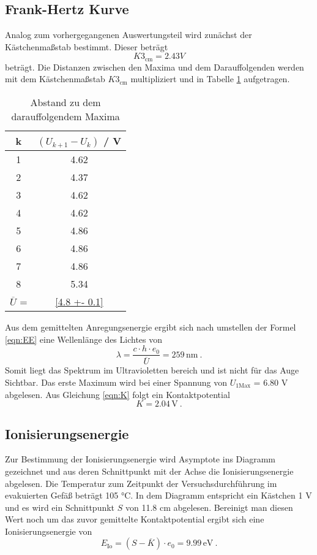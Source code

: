 \subsection{Frank-Hertz Kurve}
Analog zum vorhergegangenen Auswertungsteil wird zunächst der Kästchenmaßstab bestimmt. Dieser beträgt
\begin{equation}
  K3_\text{cm} = 2.43 V
  \label{eqn:K3}
\end{equation}
beträgt. Die Distanzen zwischen den Maxima und dem Darauffolgenden werden mit dem Kästchenmaßstab $K3_\text{cm}$ multipliziert und in Tabelle \ref{tab:Max} aufgetragen.
\begin{table}
  \centering
  \begin{tabular}{c c}
    \toprule
    	k & $(U_{k+1} - U_k)$ / V \\
    \midrule
    	1 & 4.62	\\
    	2 & 4.37	\\
    	3 & 4.62	\\
    	4 & 4.62	\\
    	5 & 4.86	\\
    	6 & 4.86	\\
    	7 & 4.86	\\
    	8 & 5.34	\\
    \midrule
    $\overline{U}$  = & \ref{4.8 +- 0.1} \\
    \bottomrule
  \end{tabular}
  \caption{Abstand zu dem darauffolgendem Maxima}
  \label{tab:Max}
\end{table}
Aus dem gemittelten Anregungsenergie ergibt sich nach umstellen der Formel \ref{eqn:EE} eine Wellenlänge des Lichtes von
\begin{equation}
  \lambda = \frac{c \cdot h \cdot e_0}{\overline{U}} = 259 \, \text{nm} \ .
  \label{eqn:spek}
\end{equation}
Somit liegt das Spektrum im Ultravioletten bereich und ist nicht für das Auge Sichtbar. Das erste Maximum wird bei einer Spannung von $U_{1 \text{Max}}$ = 6.80 V abgelesen. Aus Gleichung \ref{eqn:K} folgt ein Kontaktpotential
\begin{equation}
  K = 2.04 \, \text{V} \ .
  \label{eqn:KonFr}
\end{equation}
\subsection{Ionisierungsenergie}
Zur Bestimmung der Ionisierungsenergie wird Asymptote ins Diagramm gezeichnet und aus deren Schnittpunkt mit der Achse die Ionisierungsenergie abgelesen. Die Temperatur zum Zeitpunkt der Versuchsdurchführung im evakuierten Gefäß beträgt 105 °C. In dem Diagramm entspricht ein Kästchen 1 V und es wird ein Schnittpunkt $S$ von 11.8 cm abgelesen. Bereinigt man diesen Wert noch um das zuvor gemittelte Kontaktpotential ergibt sich eine Ionisierungsenergie von
\begin{equation}
  E_\text{Io} = (S - \overline{K}) \cdot e_0 = 9.99 \, \text{eV} \ .
  \label{eqn:EIo}
\end{equation}
